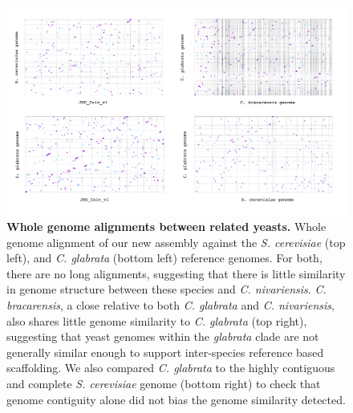 \begin{figure}[!ht]
\centering
\includegraphics[width = 1\linewidth,keepaspectratio]{figure/speciesmum.pdf}
\caption[Whole genome alignments between related yeasts]{{\bf Whole genome alignments between related yeasts.} Whole genome alignment of our new assembly against the \textit{S. cerevisiae} (top left), and \textit{C. glabrata} (bottom left) reference genomes. For both, there are no long alignments, suggesting that there is little similarity in genome structure between these species and \textit{C. nivariensis}. \textit{C. bracarensis}, a close relative to both \textit{C. glabrata} and \textit{C. nivariensis}, also shares little genome similarity to \textit{C. glabrata} (top right), suggesting that yeast genomes within the \textit{glabrata} clade are not generally similar enough to support inter-species reference based scaffolding. We also compared \textit{C. glabrata} to the highly contiguous and complete \textit{S. cerevisiae} genome (bottom right) to check that genome contiguity alone did not bias the genome similarity detected. }
\label{fig:speciesmum}
\end{figure}




